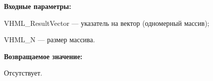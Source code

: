 \textbf{Входные параметры:} 
 
VHML\_ResultVector --- указатель на вектор (одномерный массив);
 
VHML\_N --- размер массива.

\textbf{Возвращаемое значение:}

Отсутствует.